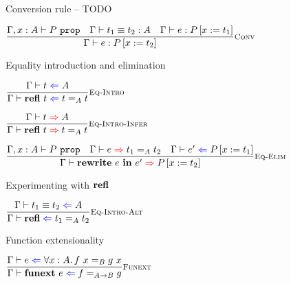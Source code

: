 \documentclass{beamer}
\begin{document}
\begin{frame}{Conversion rule -- TODO}

\begin{center}
  $\infrule[Conv]{\prop[\extend{\Gamma}{x}{A}]{P} \quad \compeq{t_1}{t_2}{A} \quad \proves{e}{\subst{P}{x}{t_1}}}{\proves{e}{\subst{P}{x}{t_2}}}$
\end{center}

\end{frame}

\begin{frame}{Equality introduction and elimination}

\begin{center}
  $\infrule[Eq-Intro]{\check{t}{A}}{\proofcheck{\refl[t]}{\Eq[A]{t}{t}}}$

  \vspace{2em}

  $\infrule[Eq-Intro-Infer]{\infer{t}{A}}{\proofinfer{\refl[t]}{\Eq[A]{t}{t}}}$

  \vspace{2em}

  $\infrule[Eq-Elim]{\prop[\extend{\Gamma}{x}{A}]{P} \quad \proofinfer{e}{\Eq[A]{t_1}{t_2}} \quad \proofcheck{e'}{\subst{P}{x}{t_1}}}{\proofinfer{\rewrite{e}{e'}}{\subst{P}{x}{t_2}}}$
\end{center}

\end{frame}

\begin{frame}{Experimenting with $\refl$}

\begin{center}
  $\infrule[Eq-Intro-Alt]{\checkcompeq{t_1}{t_2}{A}}{\proofcheck{\refl}{\Eq[A]{t_1}{t_2}}}$
\end{center}

\end{frame}

\begin{frame}{Function extensionality}

\begin{center}
  $\infrule[Funext]{\proofcheck{e}{\All{x}[A]{\Eq[B]{\app{f}{x}}{\app{g}{x}}}}}{\proofcheck{\funext{e}}{\Eq[\Fun{A}{B}]{f}{g}}}$
\end{center}

\end{frame}
\end{document}
